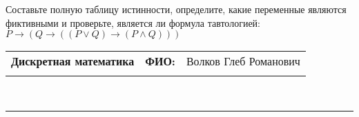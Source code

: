 \documentclass[10pt]{exam}
\newcommand{\class}{Дискретная математика}
\newcommand{\examdate}{}
\begin{document}
\begin{questions}
\begin{enumerate} [a)]
\end{enumerate}\question Составьте полную таблицу истинности, определите, какие переменные являются фиктивными и проверьте, является ли формула тавтологией:
$ P \rightarrow (Q \rightarrow ((P \lor Q) \rightarrow (P \land Q)))$

\end{questions}
\newpage
\begin{flushright}
\begin{tabular}{p{2.8in} r l}
\textbf{\class} & \textbf{ФИО:} &Волков Глеб Романович
\\

\textbf{\examdate} &&\\
\end{tabular}\\
\end{flushright}
\rule[1ex]{\textwidth}{.1pt}
\end{document}
